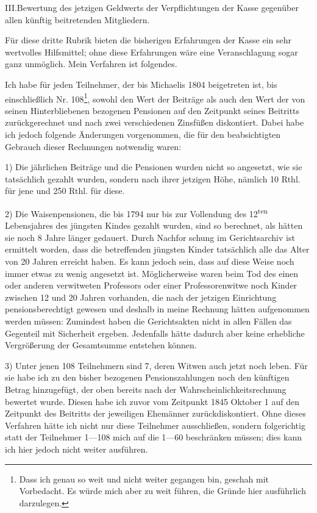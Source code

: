 \par\medskip\noindent III.\quad Bewertung des jetzigen Geldwerts der Verpflichtungen der Kasse gegenüber allen künftig beitretenden Mitgliedern.\par\smallskip
Für diese dritte Rubrik bieten die bisherigen Erfahrungen der Kasse ein sehr wertvolles Hilfsmittel; ohne diese Erfahrungen wäre eine Veranschlagung sogar ganz unmöglich. Mein Verfahren ist folgendes.

Ich habe für jeden Teilnehmer, der bis Michaelis 1804 beigetreten ist, bis einschließlich Nr. 108\footnote{Dass ich genau so weit und nicht weiter gegangen bin, geschah mit Vorbedacht. Es würde mich aber zu weit führen, die Gründe hier ausführlich darzulegen.}, sowohl den Wert der Beiträge als auch den Wert der von seinen Hinterbliebenen bezogenen Pensionen auf den Zeitpunkt seines Beitritts zurückgerechnet und nach zwei verschiedenen Zinsfüßen diskontiert. Dabei habe ich jedoch folgende Änderungen vorgenommen, die für den beabsichtigten Gebrauch dieser Rechnungen notwendig waren:

1) Die jährlichen Beiträge und die Pensionen wurden nicht so angesetzt, wie sie tatsächlich gezahlt wurden, sondern nach ihrer jetzigen Höhe, nämlich 10 Rthl. für jene und 250 Rthl. für diese.

2) Die Waisenpensionen, die bis 1794 nur bis zur Vollendung des 12\textsuperscript{ten} Lebensjahres des jüngsten Kindes gezahlt wurden, sind so berechnet, als hätten sie noch 8 Jahre länger gedauert. Durch Nachfor%
schung im Gerichtsarchiv ist ermittelt worden, dass die betreffenden jüngsten Kinder tatsächlich alle das Alter von 20 Jahren erreicht haben. Es kann jedoch sein, dass auf diese Weise noch immer etwas zu wenig angesetzt ist. Möglicherweise waren beim Tod des einen oder anderen verwitweten Professors oder einer Professorenwitwe noch Kinder zwischen 12 und 20 Jahren vorhanden, die nach der jetzigen Einrichtung pensionsberechtigt gewesen und deshalb in meine Rechnung hätten aufgenommen werden müssen: Zumindest haben die Gerichtsakten nicht in allen Fällen das Gegenteil mit Sicherheit ergeben. Jedenfalls hätte dadurch aber keine erhebliche Vergrößerung der Gesamtsumme entstehen können.

3) Unter jenen 108 Teilnehmern sind 7, deren Witwen auch jetzt noch leben. Für sie habe ich zu den bisher bezogenen Pensionszahlungen noch den künftigen Betrag hinzugefügt, der oben bereits nach der Wahrscheinlichkeitsrechnung bewertet wurde. Diesen habe ich zuvor vom Zeitpunkt 1845 Oktober 1 auf den Zeitpunkt des Beitritts der jeweiligen Ehemänner zurückdiskontiert. Ohne dieses Verfahren hätte ich nicht nur diese Teilnehmer ausschließen, sondern folgerichtig statt der Teilnehmer 1—108 mich auf die 1—60 beschränken müssen; dies kann ich hier jedoch nicht weiter ausführen.

